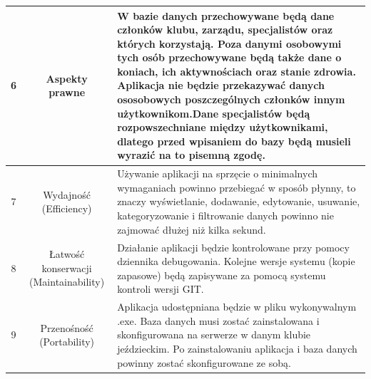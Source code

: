 \documentclass[12pt,twoside]{report}
\begin{document}
\begin{table}
\begin{tabular}{|c|c|p{8cm}|}
					\hline
		6& Aspekty prawne& W bazie danych przechowywane będą dane członków klubu, zarządu, specjalistów oraz których korzystają. Poza danymi osobowymi tych osób przechowywane będą także dane o koniach, ich aktywnościach oraz stanie zdrowia. Aplikacja nie będzie przekazywać danych ososobowych poszczególnych członków innym użytkownikom.Dane specjalistów będą rozpowszechniane między użytkownikami, dlatego przed wpisaniem do bazy będą musieli wyrazić na to pisemną zgodę.\\	
				\hline
		7& Wydajność (Efficiency)& Używanie aplikacji na sprzęcie o minimalnych wymaganiach powinno przebiegać w sposób płynny, to znaczy wyświetlanie, dodawanie, edytowanie, usuwanie, kategoryzowanie i filtrowanie danych powinno nie zajmować dłużej niż kilka sekund.\\	
		\hline
		8& Łatwość konserwacji (Maintainability)& Działanie aplikacji będzie kontrolowane przy pomocy dziennika debugowania. Kolejne wersje systemu (kopie zapasowe) będą zapisywane za pomocą systemu kontroli wersji GIT.\\	
		\hline
		9& Przenośność (Portability)& Aplikacja udostępniana będzie w pliku wykonywalnym .exe. Baza danych musi zostać zainstalowana i skonfigurowana na serwerze w danym klubie jeździeckim. Po zainstalowaniu aplikacja i baza danych powinny zostać skonfigurowane ze sobą.\\
		\hline
	\end{tabular}
\end{table}
\end{document}
